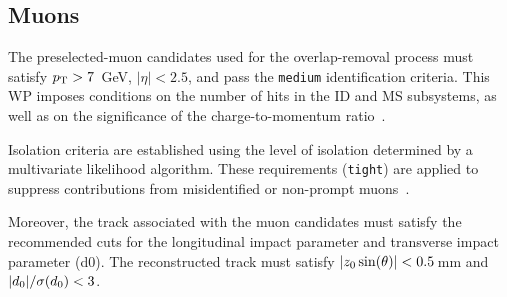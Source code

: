 \begin{comment}
In certain analysis regions, additional requirements are imposed on electrons. These include the application of 
the ``Electron Charge ID Selector Tool'' (ECIDS)~\cite{twiki-ECIDS}, which enhances the rejection of electrons 
with misidentified electrical charges. Moreover, for specific regions, cuts on the \texttt{DFCommonAddAmbiguity} 
and \texttt{ambiguityType} variables are implemented, as defined by the ``Electron Ambiguity Tool'' in 
the E/gamma derivation framework~\cite{twiki-elAmbiguity}. These cuts are designed to suppress the contribution 
from electrons originating from photon conversions by removing objects with multiple reconstructed tracks in close 
proximity to the calorimeter cluster.
It is worth noting that the requirement ``$\texttt{ambiguityType} = 0$'' in conjunction 
with ``$\texttt{DFCommonAddAmbiguity} \leq 0$'' signifies the selection of electrons with a 
veto on internal/material photon conversion candidates. In the following discussion, this will be referred 
to as the ``$e/\gamma$ ambiguity-cuts''.

\pablo{The information in subSection~\ref{sec:ChaptH:ObjectDefReco:electron} has been taken from the int-note. Maybe it is too technical.}
\end{comment}

%
%
\subsection{Muons}
\label{sec:ChaptH:ObjectDefReco:muon}
The preselected-muon candidates used for the overlap-removal process must satisfy $p_{\text{T}} > 7$~GeV, $|\eta| < 2.5$, 
and pass the \texttt{medium} identification criteria. %
This WP imposes conditions on the number of hits in the ID and MS subsystems, as well as 
on the significance of the charge-to-momentum ratio~\cite{ATLAS:2016lqx, ATLAS:2020auj}. %

Isolation criteria are established using the level of isolation determined by a multivariate likelihood algorithm.
These requirements (\texttt{tight}) are applied to suppress 
contributions from misidentified or non-prompt muons~\cite{ATLAS:2022swp}. %

Moreover, the track associated with the muon candidates must satisfy the recommended 
cuts for the longitudinal impact parameter and transverse 
impact parameter (d0). The reconstructed track must satisfy $|z_{0} \sin(\theta)| < 0.5\,$mm and $|d_{0}| / \sigma(d_{0}) < 3$. 


